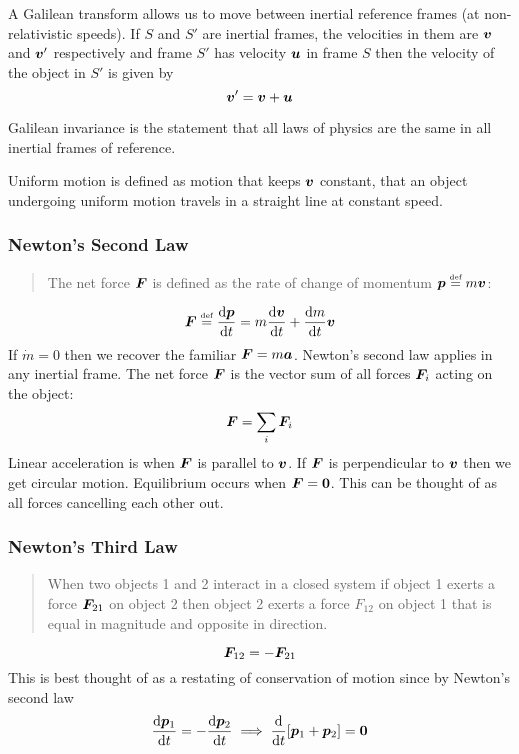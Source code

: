 \documentclass{article}
\newcommand{\defeq}{\overset{\text{\tiny def}}{=}}
\begin{document}
    A Galilean transform allows us to move between inertial reference frames (at non-relativistic speeds).
    If \(S\) and \(S'\) are inertial frames, the velocities in them are \(\bm{v}\) and \(\bm{v}'\) respectively and frame \(S'\) has velocity \(\bm{u}\) in frame \(S\) then the velocity of the object in \(S'\) is given by
    \[\bm{v}' = \bm{v} + \bm{u}\]
    
    Galilean invariance is the statement that all laws of physics are the same in all inertial frames of reference.
    
    Uniform motion is defined as motion that keeps \(\bm{v}\) constant, that an object undergoing uniform motion travels in a straight line at constant speed.
    
    \subsubsection{Newton's Second Law}
    \begin{quote}
        The net force \(\bm{F}\) is defined as the rate of change of momentum \(\vv p \defeq m\vv v\):
    \end{quote}
    \[\vv F \defeq \dv{\vv p}{t} = m\dv{\vv v}{t} + \dv{m}{t}\vv v\]
    If \(\dot m = 0\) then we recover the familiar \(\bm{F} = m\bm{a}\).
    Newton's second law applies in any inertial frame.
    The net force \(\bm{F}\) is the vector sum of all forces \(\bm{F}_i\) acting on the object:
    \[\bm{F} = \sum_i\bm{F}_i\]
    Linear acceleration is when \(\bm{F}\) is parallel to \(\bm{v}\).
    If \(\bm{F}\) is perpendicular to \(\bm{v}\) then we get circular motion.
    Equilibrium occurs when \(\bm{F} = \bm{0}\). 
    This can be thought of as all forces cancelling each other out.
    
    \subsubsection{Newton's Third Law}
    \begin{quote}
        When two objects 1 and 2 interact in a closed system if object 1 exerts a force \(\bm{F}_{21}\) on object 2 then object 2 exerts a force \(F_{12}\) on object 1 that is equal in magnitude and opposite in direction.
    \end{quote}
    \[\bm{F}_{12} = -\bm{F}_{21}\]
    This is best thought of as a restating of conservation of motion since by Newton's second law
    \[\dv{\bm{p}_1}{t} = -\dv{\bm{p}_2}{t} \implies \dv{t} [\bm{p}_1 + \bm{p}_2] = \bm{0}\]
    
\end{document}
